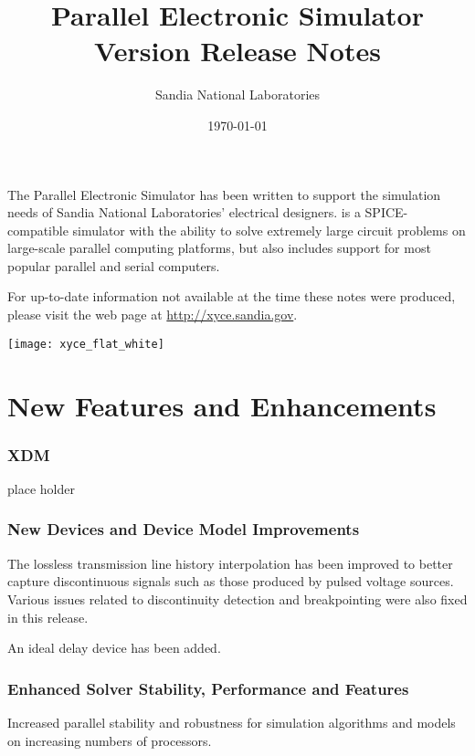 \documentclass[letterpaper]{scrartcl}
\title{\XyceTitle{} Parallel Electronic Simulator\\
Version \XyceVersionVar{} Release Notes}
\author{ Sandia National Laboratories}
\date{\today}
\begin{document}
\maketitle

The \XyceTM{} Parallel Electronic Simulator has been written to support the
simulation needs of Sandia National Laboratories' electrical designers.
\XyceTM{} is a SPICE-compatible simulator with the ability to solve extremely
large circuit problems on large-scale parallel computing platforms, but also
includes support for most popular parallel and serial computers.

For up-to-date information not available at the time these notes were produced,
please visit the \XyceTM{} web page at
{\color{XyceDeepRed}\url{http://xyce.sandia.gov}}.

\tableofcontents
\vspace*{\fill}
\parbox{\textwidth}
{
  \hfill
  \texttt{[image: xyce\_flat\_white]}
}


\newpage
\section{New Features and Enhancements}

\subsubsection*{XDM}
\begin{XyceItemize}
  \item place holder
\end{XyceItemize}

\subsubsection*{New Devices and Device Model Improvements}
\begin{XyceItemize}
  \item The lossless transmission line history interpolation has been
    improved to better capture discontinuous signals such as those
    produced by pulsed voltage sources.  Various issues related to
    discontinuity detection and breakpointing were also fixed in this
    release.
  \item An ideal delay device has been added.
\end{XyceItemize}

\subsubsection*{Enhanced Solver Stability, Performance and Features}
\begin{XyceItemize}
  \item Increased parallel stability and robustness for simulation algorithms and models
        on increasing numbers of processors.
\end{XyceItemize}
\end{document}
